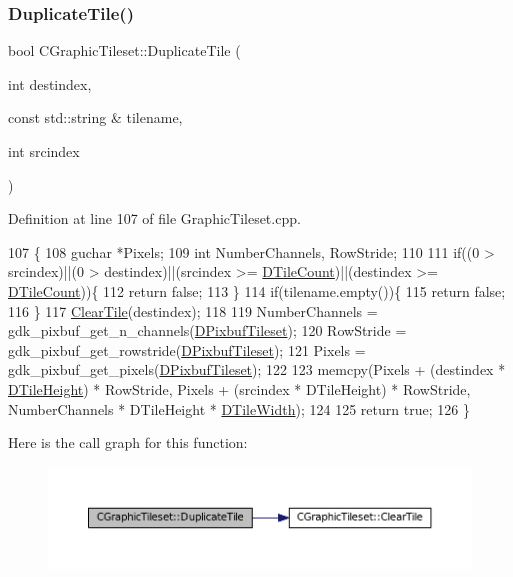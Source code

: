 \subsubsection{\texorpdfstring{Duplicate\+Tile()}{DuplicateTile()}}
{\footnotesize\ttfamily bool C\+Graphic\+Tileset\+::\+Duplicate\+Tile (\begin{DoxyParamCaption}\item[{int}]{destindex,  }\item[{const std\+::string \&}]{tilename,  }\item[{int}]{srcindex }\end{DoxyParamCaption})}



Definition at line 107 of file Graphic\+Tileset.\+cpp.


\begin{DoxyCode}
107                                                                                          \{
108     guchar *Pixels;
109     \textcolor{keywordtype}{int} NumberChannels, RowStride;
110     
111     \textcolor{keywordflow}{if}((0 > srcindex)||(0 > destindex)||(srcindex >= \hyperlink{classCGraphicTileset_a39d942b370e47f441bf97385eb1037c8}{DTileCount})||(destindex >= 
      \hyperlink{classCGraphicTileset_a39d942b370e47f441bf97385eb1037c8}{DTileCount}))\{
112         \textcolor{keywordflow}{return} \textcolor{keyword}{false};
113     \}
114     \textcolor{keywordflow}{if}(tilename.empty())\{
115         \textcolor{keywordflow}{return} \textcolor{keyword}{false};
116     \}
117     \hyperlink{classCGraphicTileset_aefeefc9e2ad01ceb8a781bd455859f76}{ClearTile}(destindex);
118     
119     NumberChannels = gdk\_pixbuf\_get\_n\_channels(\hyperlink{classCGraphicTileset_a5d5adfcdbb347a6df3f57535ca08e3ef}{DPixbufTileset});
120     RowStride = gdk\_pixbuf\_get\_rowstride(\hyperlink{classCGraphicTileset_a5d5adfcdbb347a6df3f57535ca08e3ef}{DPixbufTileset});
121     Pixels = gdk\_pixbuf\_get\_pixels(\hyperlink{classCGraphicTileset_a5d5adfcdbb347a6df3f57535ca08e3ef}{DPixbufTileset});
122     
123     memcpy(Pixels + (destindex * \hyperlink{classCGraphicTileset_af48f32e07d5fe69afd5f764318cc3244}{DTileHeight}) * RowStride, Pixels + (srcindex * DTileHeight) * 
      RowStride, NumberChannels * DTileHeight * \hyperlink{classCGraphicTileset_a2d0c7d19865b81911a3a43d5cae50e00}{DTileWidth});
124 
125     \textcolor{keywordflow}{return} \textcolor{keyword}{true};
126 \}
\end{DoxyCode}
Here is the call graph for this function\+:
\nopagebreak
\begin{figure}[H]
\begin{center}
\leavevmode
\includegraphics[width=350pt]{classCGraphicTileset_a78db70086b4cd1085fd3b5d0d0dc5fdd_cgraph}
\end{center}
\end{figure}
